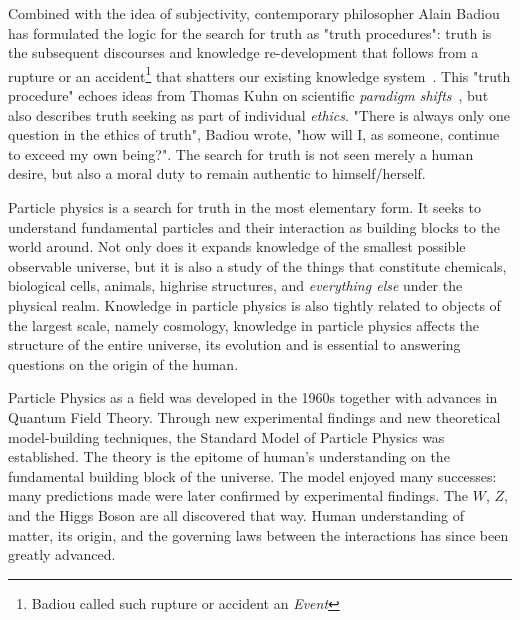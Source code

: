 Combined with the idea of subjectivity, contemporary philosopher Alain Badiou has formulated the logic for the search for truth as "truth procedures": truth is the subsequent discourses and knowledge re-development that follows from a rupture or an accident\footnote{Badiou called such rupture or accident an \textit{Event}} that shatters our existing knowledge system~\cite{badiou2007being}. This "truth procedure" echoes ideas from Thomas Kuhn on scientific \textit{paradigm
shifts}~\cite{kuhn2021structure}, but also describes truth seeking as part of individual \textit{ethics}. "There is always only one question in the ethics of truth", Badiou wrote, "how will I, as someone, continue to exceed my own being?"\cite{badiou2002ethics}. The search for truth is not seen merely a human desire, but also a moral duty to remain authentic to himself/herself.


Particle physics is a search for truth in the most elementary form. It seeks to understand fundamental particles and their interaction as building blocks to the world around. Not only does it expands knowledge of the smallest possible observable universe, but it is also a study of the things that constitute chemicals, biological cells, animals, highrise structures, and \textit{everything else} under the physical realm. Knowledge in particle physics is also tightly related to objects of the largest scale, namely cosmology, knowledge in particle physics affects the structure of the entire universe, its evolution and is essential to answering questions on the origin of the human.

Particle Physics as a field was developed in the 1960s together with advances in Quantum Field Theory. Through new experimental findings and new theoretical model-building techniques, the Standard Model of Particle Physics was established. The theory is the epitome of human's understanding on the fundamental building block of the universe. The model enjoyed many successes: many predictions made were later confirmed by experimental findings. The $W$, $Z$, and the Higgs Boson are all discovered that way. Human
understanding of matter, its origin, and the governing laws between the interactions has since been greatly advanced. 

